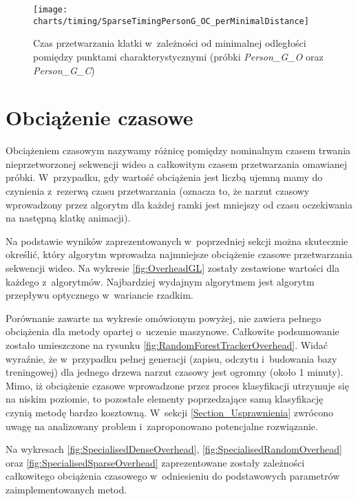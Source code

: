       \begin{figure}[!ht]
        \centering
        \texttt{[image: charts/timing/SparseTimingPersonG\_OC\_perMinimalDistance]}
        \caption[Czas przetwarzania klatki w~zależności od minimalnej odległości pomiędzy punktami charakterystycznymi]
                {Czas przetwarzania klatki w~zależności od minimalnej odległości pomiędzy punktami charakterystycznymi (próbki \textit{Person\_G\_O} oraz \textit{Person\_G\_C})}
        \label{fig:TimingPerMinimalDistance}
      \end{figure}

  \section{Obciążenie czasowe}\label{Section_Overhead}
    Obciążeniem czasowym nazywamy różnicę pomiędzy nominalnym czasem trwania nieprzetworzonej sekwencji wideo a całkowitym czasem przetwarzania omawianej próbki. W~przypadku, gdy wartość obciążenia jest liczbą ujemną mamy do czynienia z~rezerwą czasu przetwarzania (oznacza to, że narzut czasowy wprowadzony przez algorytm dla każdej ramki jest mniejszy od czasu oczekiwania na następną klatkę animacji).

    Na podstawie wyników zaprezentowanych w~poprzedniej sekcji można skutecznie określić, który algorytm wprowadza najmniejsze obciążenie czasowe przetwarzania sekwencji wideo. Na wykresie \ref{fig:OverheadGL} zostały zestawione wartości dla każdego z~algorytmów. Najbardziej wydajnym algorytmem jest algorytm przepływu optycznego w~wariancie rzadkim.

    Porównanie zawarte na wykresie omówionym powyżej, nie zawiera pełnego obciążenia dla metody opartej o~uczenie maszynowe. Całkowite podsumowanie zostało umieszczone na rysunku \ref{fig:RandomForestTrackerOverhead}. Widać wyraźnie, że w~przypadku pełnej generacji (zapisu, odczytu i~budowania bazy treningowej) dla jednego drzewa narzut czasowy jest ogromny (około 1 minuty). Mimo, iż obciążenie czasowe wprowadzone przez proces klasyfikacji utrzymuje się na niskim poziomie, to pozostałe elementy poprzedzające samą klasyfikację czynią metodę bardzo kosztowną. W~sekcji \ref{Section_Usprawnienia} zwrócono uwagę na analizowany problem i~zaproponowano potencjalne rozwiązanie.

    Na wykresach \ref{fig:SpecialisedDenseOverhead}, \ref{fig:SpecialisedRandomOverhead} oraz \ref{fig:SpecialisedSparseOverhead} zaprezentowane zostały zależności całkowitego obciążenia czasowego w~odniesieniu do podstawowych parametrów zaimplementowanych metod.

